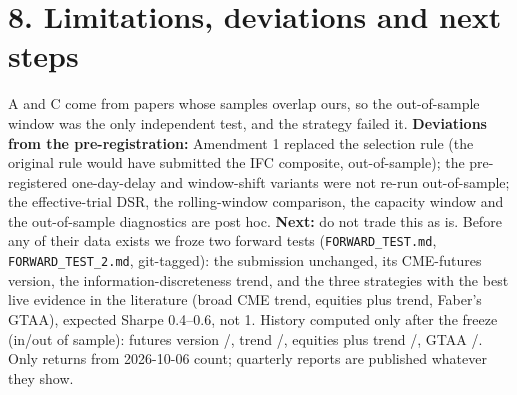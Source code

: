 \documentclass[11pt]{article}
\newcommand{\sect}[1]{\vspace{1pt}\section*{#1}\vspace{-4pt}}
\begin{document}
\sect{8. Limitations, deviations and next steps}
A and C come from papers whose samples overlap ours, so the out-of-sample window was the only independent test, and the strategy failed it. \textbf{Deviations from the pre-registration:} Amendment 1 replaced the selection rule (the original rule would have submitted the IFC composite, \IFCoos{} out-of-sample); the pre-registered one-day-delay and window-shift variants were not re-run out-of-sample; the effective-trial DSR, the rolling-window comparison, the capacity window and the out-of-sample diagnostics are post hoc. \textbf{Next:} do not trade this as is. Before any of their data exists we froze two forward tests (\texttt{FORWARD\_TEST.md}, \texttt{FORWARD\_TEST\_2.md}, git-tagged): the submission unchanged, its CME-futures version, the information-discreteness trend, and the three strategies with the best live evidence in the literature (broad CME trend, equities plus trend, Faber's GTAA), expected Sharpe 0.4--0.6, not 1. History computed only after the freeze (in/out of sample): futures version \FtwoIS/\FtwoOOS, trend \SoneIS/\SoneOOS, equities plus trend \StwoIS/\StwoOOS, GTAA \SthreeIS/\SthreeOOS. Only returns from 2026-10-06 count; quarterly reports are published whatever they show.
\end{document}
